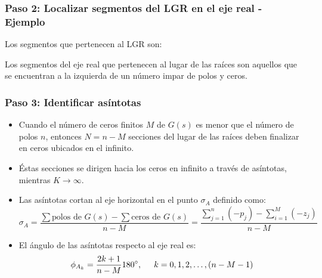 \documentclass[aspectratio=169,handout]{beamer}
\newcommand*{\rootlocusexample}[2]{%
		\foreach \x in {-4,-3,-2,-1}
   		\draw (\x cm,1pt) -- (\x cm,-1pt) node[anchor=north] {$\x$};
		\foreach \y in {-1,1}
   		\draw (-1pt,\y cm) -- (1pt,\y cm) node[anchor=east] {$\y$};
		\draw [-latex] (-4.5,0) -- (1,0) node [above]  {$\sigma$};
		\draw [-latex] (0,#1) -- (0,#2) node [right] {$j\omega$};
		\node[pole,draw=black] at (0,0) {};
		\node[pole,draw=black] at (-1,0) {};
		\node[pole,draw=black] at (-2,0) {};
		\node[zero,draw=black] at (-3,0) {};
		\node[pole,draw=black] at (-4,0) {};
}
\theoremstyle{definition}
\theoremstyle{plain}
\theoremstyle{remark}
\begin{document}
\begin{frame}[c]\frametitle{Paso 2: Localizar segmentos del LGR en el eje real - Ejemplo}
Los segmentos que pertenecen al LGR son:
\begin{figure}
\end{figure}
\begin{tcolorbox}[colback=blue!5,colframe=blue!40,title=Segmentos del LGR en el eje real]
Los segmentos del eje real que pertenecen al lugar de las raíces son aquellos que se encuentran a la izquierda de un número impar de polos y ceros.
\end{tcolorbox}
\end{frame}

\begin{frame}[c]\frametitle{Paso 3: Identificar asíntotas}
\begin{itemize}
	\item Cuando el número de ceros finitos $M$ de $G(s)$ es menor que el número de polos $n$, entonces $N = n - M$ secciones del lugar de las raíces deben finalizar en ceros ubicados en el infinito.
	\item Éstas secciones se dirigen hacia los ceros en infinito a través de asíntotas, mientras $K \rightarrow \infty$.
	\item Las asíntotas cortan al eje horizontal en el punto $\sigma_A$ definido como:
	\begin{equation*}
		\sigma_A = \frac{\sum \text{polos de } G(s) - \sum \text{ceros de } G(s)}{n-M} = \frac{\sum_{j=1}^n (-p_j) - \sum_{i=1}^M (-z_j)}{n-M} 
	\end{equation*}
	\item El ángulo de las asíntotas respecto al eje real es:
	\begin{equation*}
		\phi_{A_k} = \frac{2k+1}{n-M}\ang{180},\hspace*{5mm} k = 0, 1, 2, \dots, (n-M-1)
	\end{equation*}
\end{itemize}
\end{frame}
\end{document}
